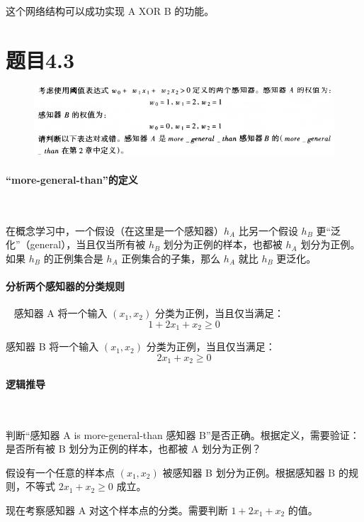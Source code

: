 \documentclass{article}
\begin{document}
    这个网络结构可以成功实现 A XOR B 的功能。

\section{题目4.3}

    \begin{figure}[!h]
       \centering
       \includegraphics[width=1.2\linewidth]{image/4.3.png}
       \label{4.3}
   \end{figure}

    \paragraph{“more-general-than”的定义}~{}

    在概念学习中，一个假设（在这里是一个感知器）$h_A$ 比另一个假设 $h_B$ 更“泛化”（general），当且仅当所有被 $h_B$ 划分为正例的样本，也都被 $h_A$ 划分为正例。如果 $h_B$ 的正例集合是 $h_A$ 正例集合的子集，那么 $h_A$ 就比 $h_B$ 更泛化。

    \paragraph{分析两个感知器的分类规则}~{}
    感知器 A 将一个输入 $(x_1, x_2)$ 分类为正例，当且仅当满足：
            \[ 1 + 2x_1 + x_2 \ge 0 \]
    
    感知器 B 将一个输入 $(x_1, x_2)$ 分类为正例，当且仅当满足：
            \[ 2x_1 + x_2 \ge 0 \]


    \paragraph{逻辑推导}~{}
    
    判断“感知器 A is more-general-than 感知器 B”是否正确。根据定义，需要验证：是否所有被 B 划分为正例的样本，也都被 A 划分为正例？
    
    假设有一个任意的样本点 $(x_1, x_2)$ 被感知器 B 划分为正例。根据感知器 B 的规则，不等式 $2x_1 + x_2 \ge 0$ 成立。
    
    现在考察感知器 A 对这个样本点的分类。需要判断 $1 + 2x_1 + x_2$ 的值。
    
\end{document}

